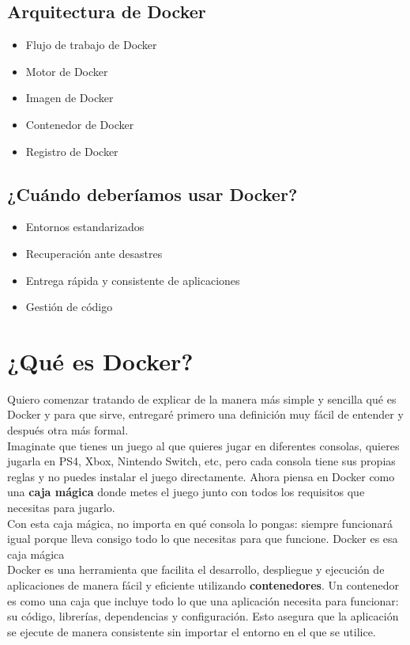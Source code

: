 \documentclass[12pt]{article}
\begin{document}
\subsection{Arquitectura de Docker}
\begin{itemize}
    \item Flujo de trabajo de Docker
    \item Motor de Docker
    \item Imagen de Docker
    \item Contenedor de Docker
    \item Registro de Docker
\end{itemize}

\subsection{¿Cuándo deberíamos usar Docker?}
\begin{itemize}
    \item Entornos estandarizados
    \item Recuperación ante desastres
    \item Entrega rápida y consistente de aplicaciones
    \item Gestión de código
\end{itemize}

\newpage
\section{¿Qué es Docker?}
\noindent
Quiero comenzar tratando de explicar de la manera más simple y sencilla qué es Docker y para que sirve, entregaré primero una definición muy fácil de entender y después otra más formal.\\
\noindent
Imaginate que tienes un juego al que quieres jugar en diferentes consolas, quieres jugarla en PS4, Xbox, Nintendo Switch, etc, pero cada consola tiene sus propias reglas y no puedes instalar el juego directamente. Ahora piensa en Docker como una \textbf{caja mágica} donde metes el juego junto con todos los requisitos que necesitas para jugarlo. \\
\noindent
Con esta caja mágica, no importa en qué consola lo pongas: siempre funcionará igual porque lleva consigo todo lo que necesitas para que funcione. Docker es esa caja mágica\\

\noindent
Docker es una herramienta que facilita el desarrollo, despliegue y ejecución de aplicaciones de manera fácil y eficiente utilizando \textbf{contenedores}. Un contenedor es como una caja que incluye todo lo que una aplicación necesita para funcionar: su código, librerías, dependencias y configuración. Esto asegura que la aplicación se ejecute de manera consistente sin importar el entorno en el que se utilice.\\
\end{document}
